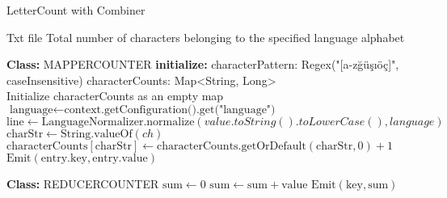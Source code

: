 \begin{algorithm}
    \caption{LetterCount with Combiner}
    \begin{algorithmic}[1]
    \Require Txt file
    \Ensure Total number of characters belonging to the specified language alphabet
    \\
    \Statex
    
    \textbf{Class:} MAPPERCOUNTER
    \State \textbf{initialize:}
    \State  characterPattern: Regex("[a-zğüşıöç]", caseInsensitive)
    \State  characterCounts: Map<String, Long> \\
    
        \State Initialize characterCounts as an empty map
    \EndProcedure\\
    
        \State $\text{language} \gets \text{context.getConfiguration().get("language")}$ 
        \State $\text{line} \gets \text{LanguageNormalizer.normalize}(value.toString().toLowerCase(), language)$
                \State $\text{charStr} \gets \text{String.valueOf}(ch)$
                \State $\text{characterCounts}[\text{charStr}] \gets \text{characterCounts.getOrDefault}(\text{charStr}, 0) + 1$
            \EndIf
        \EndFor
    \EndProcedure\\
    
            \State $\text{Emit}(\text{entry.key}, \text{entry.value})$
        \EndFor
    \EndProcedure\\
    
    \Statex
    
    \textbf{Class:} REDUCERCOUNTER
        \State $\text{sum} \gets 0$
            \State $\text{sum} \gets \text{sum} + \text{value}$
        \EndFor
        \State $\text{Emit}(\text{key}, \text{sum})$
    \EndProcedure
    \end{algorithmic}
    \end{algorithm}
    

